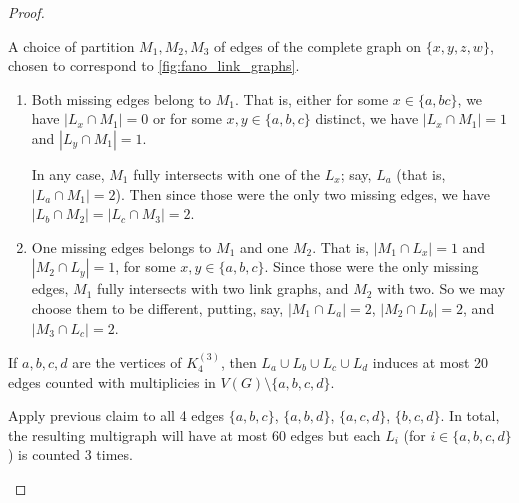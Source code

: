 \begin{proof}
\begin{subproof}
\begin{marginfigure}
\begin{center}
\end{center}
\caption{A choice of partition $M_1,M_2,M_3$ of edges of the complete graph on  $\{x,y,z,w\}$, chosen to correspond to \cref{fig:fano_link_graphs}.  \label{fig:complete_graph_in_links_fano}}
\end{marginfigure}
\begin{enumerate}[{Case }1:]
	\item  Both missing edges belong to $M_1$. That is, either for some $x\in \{a,bc\}$, we have $|L_x\cap M_1| = 0$ or for some $x,y\in \{a,b,c\}$ distinct, we have $|L_x\cap M_1| = 1$ and $|L_y\cap M_1| = 1$.

  In any case, $M_1$ fully intersects with one of the $L_x$; say, $L_a$ (that is, $|L_a\cap M_1|= 2$). Then since those were the only two missing edges, we have $|L_b\cap M_2| = |L_c\cap M_3|=2$. 
	\item One missing edges belongs to $M_1$ and one $M_2$. That is, $|M_1\cap L_x| = 1$ and $|M_2\cap L_y| = 1$, for some $x,y\in\{a,b,c\}$. Since those were the only missing edges, $M_1$ fully intersects with two link graphs, and $M_2$ with two. So we may choose them to be different, putting, say, $|M_1\cap L_a|=2$, $|M_2\cap L_b|=2$, and $|M_3\cap L_c|=2$.\qedhere
\end{enumerate}
\end{subproof}

\begin{claim}
If $a,b,c,d$ are the vertices of $K_4^{(3)}$, then $L_a\cup L_b\cup L_c\cup L_d$ induces at most 20 edges counted with multiplicies in $V(G)\setminus \{a,b,c,d\}$.
\end{claim}
\begin{subproof}	
Apply previous claim to all 4 edges $\{a,b,c\}$, $\{a,b,d\}$, $\{a,c,d\}$, $\{b,c,d\}$. In total, the resulting multigraph will have at most 60 edges but each $L_i$ (for $i\in \{a,b,c,d\}$) is counted 3 times.
\end{subproof}


\end{proof}
